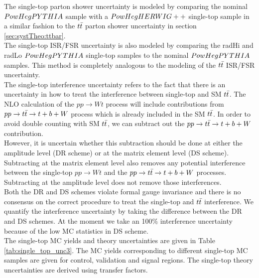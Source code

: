 \indent The single-top parton shower uncertainty is modeled by comparing the nominal $PowHegPYTHIA$ sample with a $PowHegHERWIG++$ single-top sample in a similar fashion to the $t\bar{t}$ parton shower uncertainty in section \ref{sec:systTheo:ttbar}.  \\

\indent The single-top ISR/FSR uncertainty is also modeled by comparing the radHi and radLo $PowHegPYTHIA$ single-top samples to the nominal $PowHegPYTHIA$ samples.  This method is completely analogous to the modeling of the $t\bar{t}$ ISR/FSR uncertainty. \\

\indent The single-top interference uncertainty refers to the fact that there is an uncertainty in how to treat the interference between single-top and SM $t\bar{t}$.  The NLO calculation of the $pp \rightarrow Wt$ process will include contributions from $ pp \rightarrow t\bar{t} \rightarrow t + b + W$ process which is already included in the SM $t\bar{t}$.  In order to avoid double counting with SM $t\bar{t}$, we can subtract out the $pp \rightarrow t\bar{t} \rightarrow t + b + W$ contribution.  \\

\indent However, it is uncertain whether this subtraction should be done at either the amplitude level (DR scheme) or at the matrix element level (DS scheme).  Subtracting at the matrix element level also removes any potential interference between the single-top $pp \rightarrow Wt$ and the $ pp \rightarrow t\bar{t} \rightarrow t + b + W$ processes.  Subtracting at the amplitude level does not remove those interferences. \\

\indent  Both the DR and DS schemes violate formal gauge invariance and there is no consensus on the correct procedure to treat the single-top and  $t\bar{t}$ interference.  We quantify the interference uncertainty by taking the difference between the DR and DS schemes.  At the moment we take an 100\% interference uncertainty because of the low MC statistics in DS scheme. \\

\indent The single-top MC yields and theory uncertainties are given in Table \ref{tab:single_top_unc3}.  The MC yields corresponding to different single-top MC samples are given for control, validation and signal regions.  The single-top theory uncertainties are derived using transfer factors. \\

